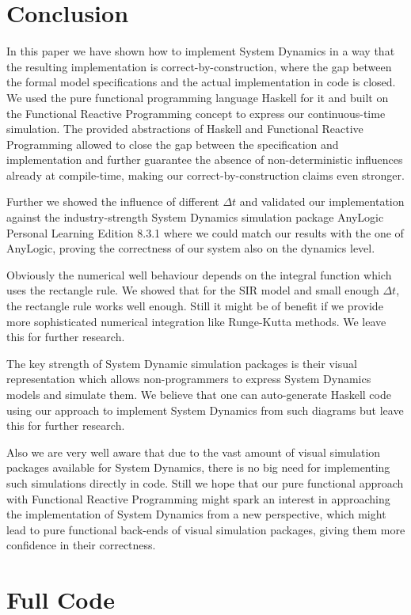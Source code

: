 \section{Conclusion}
In this paper we have shown how to implement System Dynamics in a way that the resulting implementation is correct-by-construction, where the gap between the formal model specifications and the actual implementation in code is closed. We used the pure functional programming language Haskell for it and built on the Functional Reactive Programming concept to express our continuous-time simulation. The provided abstractions of Haskell and Functional Reactive Programming allowed to close the gap between the specification and implementation and further guarantee the absence of non-deterministic influences already at compile-time, making our correct-by-construction claims even stronger.

Further we showed the influence of different $\Delta t$ and validated our implementation against the industry-strength System Dynamics simulation package AnyLogic Personal Learning Edition 8.3.1 where we could match our results with the one of AnyLogic, proving the correctness of our system also on the dynamics level.

Obviously the numerical well behaviour depends on the integral function which uses the rectangle rule. We showed that for the SIR model and small enough $\Delta t$, the rectangle rule works well enough. Still it might be of benefit if we provide more sophisticated numerical integration like Runge-Kutta methods. We leave this for further research.

The key strength of System Dynamic simulation packages is their visual representation which allows non-programmers to express System Dynamics models and simulate them. We believe that one can auto-generate Haskell code using our approach to implement System Dynamics from such diagrams but leave this for further research.

Also we are very well aware that due to the vast amount of visual simulation packages available for System Dynamics, there is no big need for implementing such simulations directly in code. Still we hope that our pure functional approach with Functional Reactive Programming might spark an interest in approaching the implementation of System Dynamics from a new perspective, which might lead to pure functional back-ends of visual simulation packages, giving them more confidence in their correctness.

\section{Full Code}

